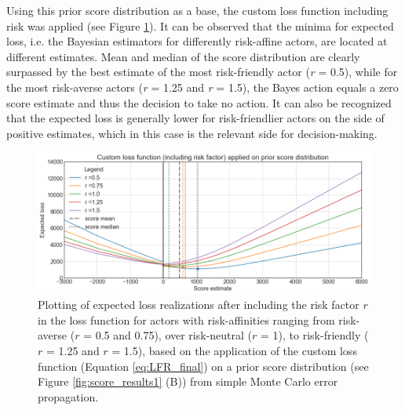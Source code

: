 			Using this prior score distribution as a base, the custom loss function including risk was applied (see Figure \ref{fig:1D_LFR}). It can be observed that the minima for expected loss, i.e. the Bayesian estimators for differently risk-affine actors, are located at different estimates. Mean and median of the score distribution are clearly surpassed by the best estimate of the most risk-friendly actor (\textit{r} = 0.5), while for the most risk-averse actors (\textit{r} = 1.25 and \textit{r} = 1.5), the Bayes action equals a zero score estimate and thus the decision to take no action. It can also be recognized that the expected loss is generally lower for risk-friendlier actors on the side of positive estimates, which in this case is the relevant side for decision-making.		
			\begin{figure}[h]
				\centering
				\includegraphics[width=1\textwidth]{Figures/LFR.png}
				\caption{Plotting of expected loss realizations after including the risk factor $r$ in the loss function  for actors with risk-affinities ranging from risk-averse ($r$ = 0.5 and 0.75), over risk-neutral ($r$ = 1), to risk-friendly ($r$ = 1.25 and $r$ = 1.5), based on the application of the custom loss function (Equation \ref{eq:LFR_final}) on a prior score distribution (see Figure \ref{fig:score_results1} (B)) from simple Monte Carlo error propagation.}\label{fig:1D_LFR} 
			\end{figure}			
